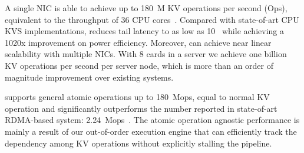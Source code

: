 %
A single NIC \oursys{} is able to achieve up to 180~M KV operations per second (Ops), equivalent to the throughput of 36 CPU cores~\cite{li2016full}. Compared with state-of-art CPU KVS implementations, \oursys{} reduces tail latency to as low as 10~\mus{} while achieving a 10\approx20x improvement on power efficiency. Moreover, \oursys{} can achieve near linear scalability with multiple NICs. With 8 \ournic{} cards in a server we achieve one billion KV operations per second per server node, which is more than an order of magnitude improvement over existing systems.

\oursys{} supports general atomic operations up to 180~Mops, equal to normal KV operation and significantly outperforms the number reported in state-of-art RDMA-based system: 2.24~Mops~\cite{kalia2014using}. The atomic operation agnostic performance is mainly a result of our out-of-order execution engine that can efficiently track the dependency among KV operations without explicitly stalling the pipeline.


